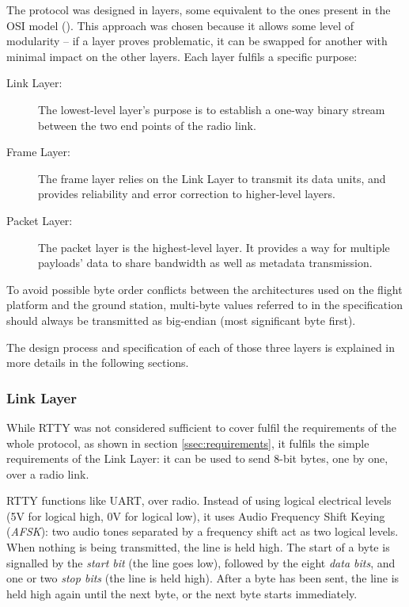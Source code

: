 The protocol was designed in layers, some equivalent to the ones present in the
OSI model (\cite{Stallings1987}). This approach was chosen because it allows
some level of modularity – if a layer proves problematic, it can be swapped
for another with minimal impact on the other layers. Each layer fulfils a
specific purpose:


\begin{description}
\item[Link Layer:] The lowest-level layer's purpose is to establish a one-way
binary stream between the two end points of the radio link.

\item[Frame Layer:] The frame layer relies on the Link Layer to transmit its
data units, and provides reliability and error correction to higher-level 
layers.

\item[Packet Layer:] The packet layer is the highest-level layer. It provides
a way for multiple payloads' data to share bandwidth as well as metadata
transmission.
\end{description}

To avoid possible byte order conflicts between the architectures used on the
flight platform and the ground station, multi-byte values referred to in the
specification should always be transmitted as big-endian (most significant byte
first).

The design process and specification of each of those three layers is explained
in more details in the following sections.

\subsubsection{Link Layer}
\label{sssec:link-layer}


While RTTY was not considered sufficient to cover fulfil the requirements of
the whole protocol, as shown in section \ref{ssec:requirements}, it fulfils the
simple requirements of the Link Layer: it can be used to send 8-bit bytes, one
by one, over a radio link.

RTTY functions like UART, over radio. Instead of using logical electrical levels
(5V for logical high, 0V for logical low), it uses Audio Frequency Shift Keying
(\textit{AFSK}): two audio tones separated by a frequency shift act as two
logical levels. When nothing is being transmitted, the line is held high. The
start of a byte is signalled by the \textit{start bit} (the line goes low),
followed by the eight \textit{data bits}, and one or two \textit{stop bits} (the
line is held high). After a byte has been sent, the line is held high again
until the next byte, or the next byte starts immediately.

